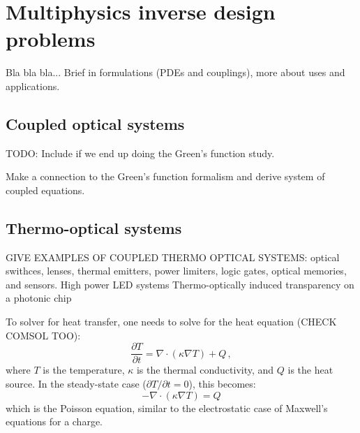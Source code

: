 \chapter{Multiphysics inverse design problems}

Bla bla bla... Brief in formulations (PDEs and couplings), more about uses and applications.






\section{Coupled optical systems}

TODO: Include if we end up doing the Green's function study.

 Make a connection to the Green's function formalism and derive system of coupled equations.

\section{Thermo-optical systems}

GIVE EXAMPLES OF COUPLED THERMO OPTICAL SYSTEMS: optical swithces, lenses, thermal emitters,
power limiters, logic gates, optical memories, and sensors.
High power LED systems
Thermo-optically induced transparency on a photonic chip

To solver for heat transfer, one needs to solve for the heat equation (CHECK COMSOL TOO):
\begin{equation}
    \frac{\partial T}{\partial t} = \nabla \cdot (\kappa \nabla T) + Q\,,
\end{equation}
where $T$ is the temperature, $\kappa$ is the thermal conductivity, and $Q$ is the heat source.
In the steady-state case ($\partial T / \partial t = 0$), this becomes:
\begin{equation}
    -\nabla \cdot (\kappa \nabla T) = Q
\end{equation}
which is the Poisson equation, similar to the electrostatic case of Maxwell's equations for a charge.


